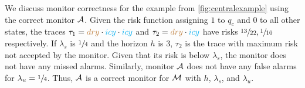 \documentclass[runningheads]{llncs}
\newcommand{\icy}{{\color{cyan} icy}\xspace}
\newcommand{\dry}{{\color{brown} dry}\xspace}
\renewcommand{\paragraph}[1]{\smallskip\noindent\emph{#1}}
\begin{document}
%
%
%
%
%

\begin{example}
    We discuss monitor correctness for the example from \cref{fig:centralexample} using the correct monitor $\mathcal{A}$.
    Given the risk function assigning $1$ to $q_c$ and $0$ to all other states, the traces $\tau_1 = \dry \cdot \icy \cdot \icy$ and $\tau_2 = \dry \cdot \icy$ have risks $\sfrac{13}{22}, \sfrac{1}{10}$ respectively. If $\lambda_s$ is $\sfrac{1}{4}$ and the horizon $h$ is 3, $\tau_2$ is the trace with maximum risk not accepted by the monitor. Given that its risk is below $\lambda_s$, the monitor does not have any missed alarms. Similarly, monitor $\mathcal{A}$ does not have any false alarms for $\lambda_u = \sfrac{1}{4}$. Thus, $\mathcal{A}$ is a correct monitor for $\mathcal{M}$ with $h$, $\lambda_s$, and $\lambda_u$.
\end{example}
\end{document}
